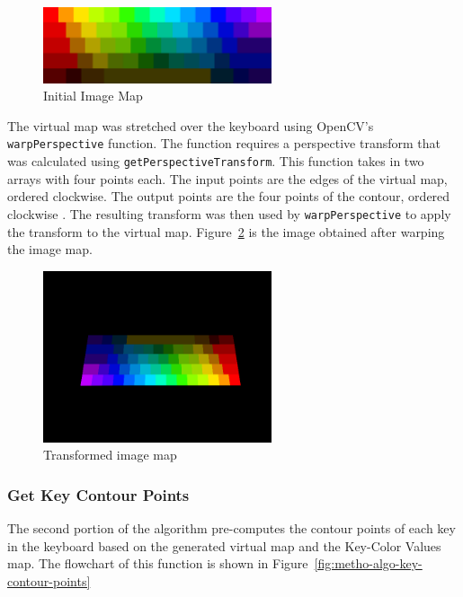 \documentclass{report}
\begin{document}
\begin{figure}[H]
	\centering
	\includegraphics[width=0.6\textwidth]{image-map.png}
	\caption{Initial Image Map}
	\label{fig:metho-algo-key-map}
	\centering
\end{figure}

The virtual map was stretched over the keyboard using OpenCV's
\texttt{warpPerspective} function. The function requires a perspective transform
that was calculated using \texttt{getPerspectiveTransform}. This function takes
in two arrays with four points each. The input points are the edges of the
virtual map, ordered clockwise. The output points are the four points of the
contour, ordered clockwise \parencite{opencv-image-transform}. The resulting
transform was then used by \texttt{warpPerspective} to apply the transform to
the virtual map. Figure~\ref{fig:metho-algo-transform} is the image obtained
after warping the image map.

\begin{figure}[H]
	\centering
	\includegraphics[width=0.6\textwidth]{transformed-image-map.png}
	\caption{Transformed image map}
	\label{fig:metho-algo-transform}
	\centering
\end{figure}

\subsubsection{Get Key Contour Points}
The second portion of the algorithm pre-computes the contour points of each key
in the keyboard based on the generated virtual map and the Key-Color Values map.
The flowchart of this function is shown in
Figure~\ref{fig:metho-algo-key-contour-points}
\end{document}
